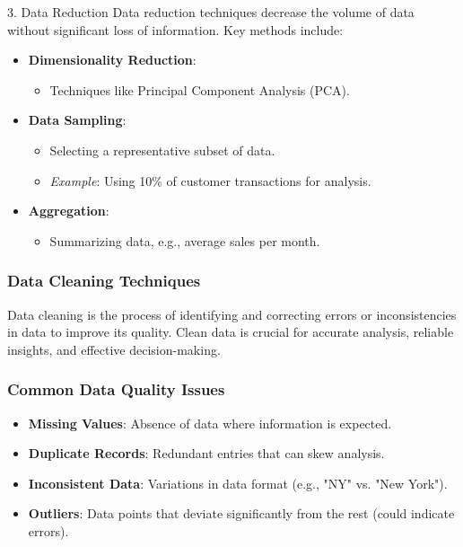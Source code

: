 \documentclass{beamer}
\begin{document}
\begin{frame}[fragile]
    \begin{block}{3. Data Reduction}
        Data reduction techniques decrease the volume of data without significant loss of information. Key methods include:
        \begin{itemize}
            \item \textbf{Dimensionality Reduction}:
                \begin{itemize}
                    \item Techniques like Principal Component Analysis (PCA).
                \end{itemize}
            \item \textbf{Data Sampling}:
                \begin{itemize}
                    \item Selecting a representative subset of data.
                    \item \textit{Example}: Using 10\% of customer transactions for analysis.
                \end{itemize}
            \item \textbf{Aggregation}:
                \begin{itemize}
                    \item Summarizing data, e.g., average sales per month.
                \end{itemize}
        \end{itemize}
    \end{block}
\end{frame}

\begin{frame}[fragile]
    \frametitle{Data Cleaning Techniques}
    Data cleaning is the process of identifying and correcting errors or inconsistencies in data to improve its quality. Clean data is crucial for accurate analysis, reliable insights, and effective decision-making.
\end{frame}

\begin{frame}[fragile]
    \frametitle{Common Data Quality Issues}
    \begin{itemize}
        \item \textbf{Missing Values}: Absence of data where information is expected.
        \item \textbf{Duplicate Records}: Redundant entries that can skew analysis.
        \item \textbf{Inconsistent Data}: Variations in data format (e.g., "NY" vs. "New York").
        \item \textbf{Outliers}: Data points that deviate significantly from the rest (could indicate errors).
    \end{itemize}
\end{frame}
\end{document}
